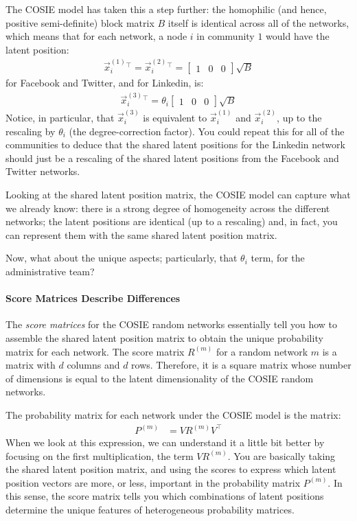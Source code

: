 The COSIE model has taken this a step further: the homophilic (and hence, positive semi-definite) block matrix $B$ itself is identical across all of the networks, which means that for each network, a node $i$ in community $1$ would have the latent position:
\begin{align*}
    \vec x_i^{(1)}^\top = \vec x_i^{(2)}^\top = \begin{bmatrix}1 & 0 & 0\end{bmatrix} \sqrt B
\end{align*}
for Facebook and Twitter, and for Linkedin, is:
\begin{align*}
    \vec x_i^{(3)}^\top = \theta_i\begin{bmatrix}1 & 0 & 0\end{bmatrix} \sqrt B
\end{align*}
Notice, in particular, that $\vec x_i^{(3)}$ is equivalent to $\vec x_i^{(1)}$ and $\vec x_i^{(2)}$, up to the rescaling by $\theta_i$ (the degree-correction factor). You could repeat this for all of the communities to deduce that the shared latent positions for the Linkedin network should just be a rescaling of the shared latent positions from the Facebook and Twitter networks.

Looking at the shared latent position matrix, the COSIE model can capture what we already know: there is a strong degree of {homogeneity} across the different networks; the latent positions are identical (up to a rescaling) and, in fact, you can represent them with the same shared latent position matrix. 

Now, what about the unique aspects; particularly, that $\theta_i$ term, for the administrative team?

\paragraph{Score Matrices Describe Differences}
\label{sec:ch5:multi:cosie:score}

The \textit{score matrices} for the COSIE random networks essentially tell you how to assemble the shared latent position matrix to obtain the unique probability matrix for each network. The score matrix $R^{(m)}$ for a random network $m$ is a matrix with $d$ columns and $d$ rows. Therefore, it is a square matrix whose number of dimensions is equal to the latent dimensionality of the COSIE random networks.

The probability matrix for each network under the COSIE model is the matrix:
\begin{align*}
    P^{(m)} &= VR^{(m)}V^\top
\end{align*}
When we look at this expression, we can understand it a little bit better by focusing on the first multiplication, the term $VR^{(m)}$. You are basically taking the shared latent position matrix, and using the scores to express which latent position vectors are more, or less, important in the probability matrix $P^{(m)}$. In this sense, the score matrix tells you which combinations of latent positions determine the unique features of heterogeneous probability matrices.

